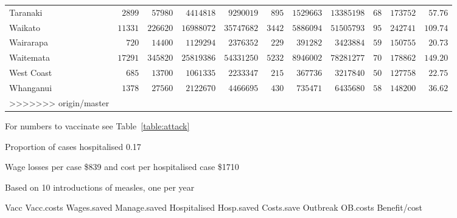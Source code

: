 \documentclass{article}
\begin{document}
\begin{itemize}
\begin{table}
\begin{center}
\begin{tabular}{lrrrrrrrrrr}
Taranaki&$ 2899$&$ 57980$&$ 4414818$&$ 9290019$&$ 895$&$1529663$&$13385198$&$ 68$&$173752$&$ 57.76$\tabularnewline
Waikato&$11331$&$226620$&$16988072$&$35747682$&$3442$&$5886094$&$51505793$&$ 95$&$242741$&$109.74$\tabularnewline
Wairarapa&$  720$&$ 14400$&$ 1129294$&$ 2376352$&$ 229$&$ 391282$&$ 3423884$&$ 59$&$150755$&$ 20.73$\tabularnewline
Waitemata&$17291$&$345820$&$25819386$&$54331250$&$5232$&$8946002$&$78281277$&$ 70$&$178862$&$149.20$\tabularnewline
West Coast&$  685$&$ 13700$&$ 1061335$&$ 2233347$&$ 215$&$ 367736$&$ 3217840$&$ 50$&$127758$&$ 22.75$\tabularnewline
Whanganui&$ 1378$&$ 27560$&$ 2122670$&$ 4466695$&$ 430$&$ 735471$&$ 6435680$&$ 58$&$148200$&$ 36.62$\tabularnewline
>>>>>>> origin/master
\hline
\end{tabular}\end{center}\label{table:cost20}
\begin{tablenotes}\footnotesize  
        \item For numbers to vaccinate see Table~\ref{table:attack}
        \item Proportion of cases hospitalised 0.17
        \item Wage losses per case \$839 and cost per hospitalised case \$1710
        \item Based on 10 introductions of measles, one per year
      \end{tablenotes}  
\end{table}

Vacc  Vacc.costs	Wages.saved	Manage.saved	Hospitalised	Hosp.saved	Costs.save	Outbreak	OB.costs	Benefit/cost



\end{itemize}
\end{document}
